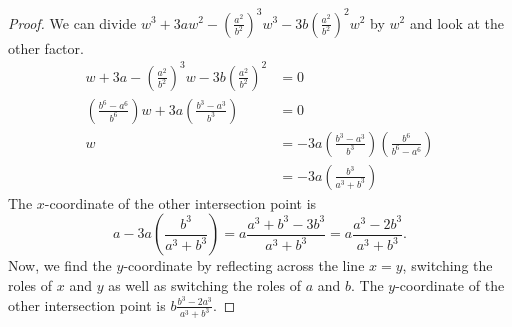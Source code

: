 \documentclass[12pt]{article}
\theoremstyle{plain}
\begin{document}
\begin{proof}
  We can divide $w^3+3aw^2-\left(\frac{a^2}{b^2}\right)^3w^3-3b\left(\frac{a^2}{b^2}\right)^2w^2$ by $w^2$ and look at the other factor.
  \begin{align*}
    w+3a-\left(\frac{a^2}{b^2}\right)^3w-3b\left(\frac{a^2}{b^2}\right)^2 &= 0 \\
    \left(\frac{b^6-a^6}{b^6}\right)w+3a\left(\frac{b^3-a^3}{b^3}\right)  &= 0 \\
    w &= -3a\left(\frac{b^3-a^3}{b^3}\right)\left(\frac{b^6}{b^6-a^6}\right) \\
      &= -3a\left(\frac{b^3}{a^3+b^3}\right)
  \end{align*}
  The $x$-coordinate of the other intersection point is
  \[
    a-3a\left(\frac{b^3}{a^3+b^3}\right)=a\frac{a^3+b^3-3b^3}{a^3+b^3}=a\frac{a^3-2b^3}{a^3+b^3}.
  \]
  Now, we find the $y$-coordinate by reflecting across the line $x=y$, switching the roles of $x$ and $y$ as well as switching the roles of $a$ and $b$. The $y$-coordinate of the other intersection point is $b\frac{b^3-2a^3}{a^3+b^3}$.
\end{proof}
\end{document}
